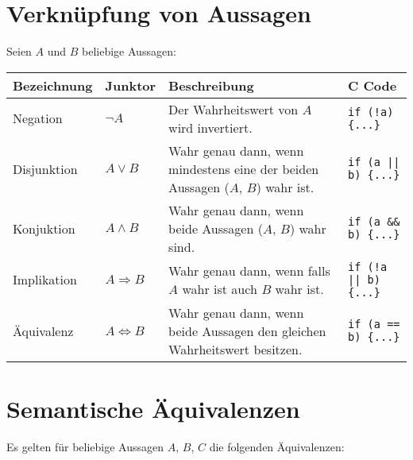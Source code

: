 \documentclass{article}
\begin{document}
\large
\section*{Verknüpfung von Aussagen}
Seien $A$ und $B$ beliebige Aussagen:

\begin{adjustbox}{center}
	\setlength{\extrarowheight}{10pt}
	\begin{tabular}{L{4cm}|C{1.5cm}|L{5cm}|C{5cm}}
		Bezeichnung & Junktor               & Beschreibung                                                                   & C Code                         \\
		[10pt]\midrule
		Negation    & $\neg A$              & Der Wahrheitswert von $A$ wird invertiert.                                     & \texttt{if (!a) \{...\}}       \\
		[10pt]
		Disjunktion & $A \lor B$            & Wahr genau dann, wenn mindestens eine der beiden Aussagen ($A$, $B$) wahr ist. & \texttt{if (a || b) \{...\}}   \\
		[10pt]
		Konjuktion  & $A \land B$           & Wahr genau dann, wenn beide Aussagen ($A$, $B$) wahr sind.                     & \texttt{if (a \&\& b) \{...\}} \\
		[10pt]
		Implikation & $A \Rightarrow B$     & Wahr genau dann, wenn falls $A$ wahr ist auch $B$ wahr ist.                    & \texttt{if (!a || b) \{...\}}  \\
		[10pt]
		Äquivalenz  & $A \Leftrightarrow B$ & Wahr genau dann, wenn beide Aussagen den gleichen Wahrheitswert besitzen.      & \texttt{if (a == b) \{...\}}
	\end{tabular}
\end{adjustbox}

\newpage

\section*{Semantische Äquivalenzen}
Es gelten für beliebige Aussagen $A$, $B$, $C$ die folgenden Äquivalenzen:
\end{document}
